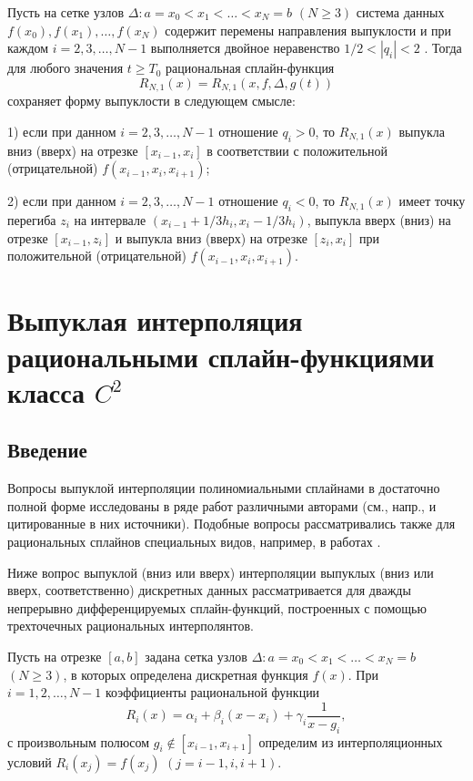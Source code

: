 \begin{theorem}\label{ark-teor2}
Пусть на сетке узлов $\Delta: a=x_0<x_1<\dots<x_N=b$
$(N\geqslant 3)$ система данных $f(x_0), f(x_1),\dots,f(x_N)$  содержит перемены направления
выпуклости и при каждом $i=2,3,\dots,N-1$ выполняется двойное неравенство $1/2<|q_i|<2$ .
Тогда для любого значения $t\geqslant T_0$ рациональная сплайн-функция
 $$R_{N,1}(x)=R_{N,1} (x, f, \Delta, g(t))$$ сохраняет форму выпуклости в следующем смысле{:}

1) если при данном $i=2,3,\dots,N-1$ отношение $q_i>0$, то $R_{N,1}(x)$ выпукла вниз {(}вверх{)} на
отрезке $[x_{i-1}, x_i]$ в соответствии с положительной {(}отрицательной{)} $f(x_{i-1},x_i,x_{i+1})${;}

2) если при данном $i=2,3,\dots,N-1$ отношение $q_i<0$, то $R_{N,1}(x)$ имеет точку перегиба
$z_i$ на интервале $\left(x_{i-1}+ 1/3h_i, x_i-1/3 h_i\right)$, выпукла вверх {(}вниз{)} на
отрезке $[x_{i-1}, z_i]$ и выпукла вниз {(}вверх{)} на отрезке $[z_i, x_i]$
при положительной {(}отрицательной{)} $f(x_{i-1},x_i,x_{i+1})$.
 \end{theorem}

 \chapter{Выпуклая интерполяция рациональными сплайн-функциями класса $C^2$}
\section{Введение}

Вопросы выпуклой интерполяции полиномиальными сплайнами в достаточно полной
форме исследованы в ряде работ различными авторами (см., напр., \cite{ark-1, ark-2, ark-3, ark-4, ark-5} и цитированные
в них источники). Подобные вопросы рассматривались также для рациональных сплайнов специальных
видов, например, в работах \cite{ark-8, ark-9, ark-10, ark-11}.

Ниже вопрос выпуклой (вниз или вверх) интерполяции выпуклых (вниз или вверх, соответственно)
дискретных данных рассматривается  для дважды непрерывно дифференцируемых сплайн-функций, построенных с помощью
 трехточечных рациональных интерполянтов.

Пусть на отрезке $[a,b]$ задана сетка узлов
$\Delta: a=x_0<x_1<\dots<x_N=b$ $(N\geqslant 3)$, в которых определена дискретная функция $f(x)$.
При $i=1,2,\dots, N-1$  коэффициенты рациональной функции
\begin{equation*}
R_i(x)=\alpha_i+\beta_i (x-x_i)+\gamma_i \frac 1{x-g_i},
\end{equation*}
с произвольным полюсом $g_i\not \in [x_{i-1}, x_{i+1}]$ определим из интерполяционных условий
$R_i(x_j)=f(x_j)$ $(j=i-1,i,i+1)$.

